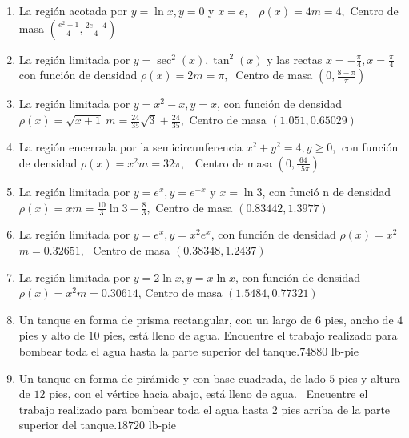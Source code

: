{\begin{enumerate}
\item { La región acotada por $y=\ln x,y=0$ y $x=e,$ \ $\rho \left(
x\right) =4$}{$m=4,$ Centro de masa $\left( \frac{e^{2}+1}{4},\frac{2e-4}{4}\right) $}



\item {La región limitada por $y=\sec ^{2}\left( x\right) ,\tan ^{2}\left(
x\right) $ y las rectas $x=-\frac{\pi }{4},x=\frac{\pi }{4}$ con función
    de densidad $\rho \left( x\right) =2$}{$m=\pi ,$ $\ $Centro de masa $\left( 0,\frac{8-\pi}{\pi} \right) $}
    


\item {La región limitada por $y=x^{2}-x,y=x$, con función de densidad $%
\rho \left( x\right) =\sqrt{x+1}$}{$\ m=\frac{24}{35}\sqrt{3}+\frac{24}{35},$ Centro de masa $\left(1.051,0.65029\right) $}



\item {La región encerrada por la semicircunferencia $x^{2}+y^{2}=4,y\geq 0$,
$\ $con función de densidad $\rho \left( x\right) =x^{2}$}{$m=32\pi ,$ \ Centro de masa $\left( 0,\frac{64}{15 \pi} \right)$}



\item {La región limitada por $y=e^{x},y=e^{-x}$ y $x=\ln 3$, con funció%
n de densidad $\rho \left( x\right) =x$}{$m=\frac{10}{3}\ln 3-\frac{8}{3},$ Centro de masa $\left(
0.83442,1.3977\right) $}



\item {La región limitada por $y=e^{x},y=x^{2}e^{x}$, con función de
densidad $\rho \left( x\right) =x^{2}$}{$m=0.32651$, \ Centro de masa $\left( 0.38348,1.2437\right) $}



\item {La región limitada por $y=2\ln x,y=x\ln x$, con función de
densidad $\rho \left( x\right) =x^{2}$}{$m=0.30614$, Centro de masa $\left( 1.5484,0.77321\right) $}



\item {Un tanque en forma de prisma rectangular, con un largo de $6$ pies, ancho de $4$ pies y alto de $10$ pies, está lleno de agua. Encuentre el trabajo
realizado para bombear toda el agua hasta la parte superior del tanque.}{$74880$ lb-pie}



\item {Un tanque en forma de pirámide y con base cuadrada, de lado $5$ pies y
altura de $12$ pies, con el vértice hacia abajo, está lleno de agua. \
Encuentre el trabajo realizado para bombear toda el agua hasta $2$ pies arriba
de la parte superior del tanque.}{$18720$ lb-pie}




\end{enumerate}}
